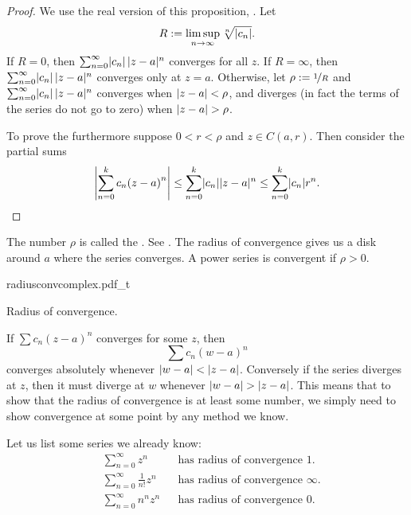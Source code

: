 \begin{proof}
We use the real version of this proposition,
.
Let
\begin{equation*}
R := \limsup_{n\to\infty} \sqrt[n]{\lvert {c_n} \rvert} .
\end{equation*}
If $R = 0$, then
$\sum_{n=0}^\infty \lvert {c_n} \rvert \, \lvert {z-a} \rvert^n$ converges for all $z$.
If $R = \infty$, then
$\sum_{n=0}^\infty \lvert {c_n} \rvert \, \lvert {z-a} \rvert^n$ converges only at $z=a$.
Otherwise, let $\rho := \nicefrac{1}{R}$ and
$\sum_{n=0}^\infty \lvert {c_n} \rvert \, \lvert {z-a} \rvert^n$ converges when
$\lvert {z-a} \rvert < \rho$, and diverges (in fact the terms of the series
do not go to zero) when $\lvert {z-a} \rvert > \rho$.

To prove the furthermore suppose
$0 < r < \rho$ and $z \in C(a,r)$.  Then
consider the partial sums
\begin{equation*}
\left\lvert {\sum_{n=0}^k c_n {(z-a)}^n} \right\rvert
\leq
\sum_{n=0}^k \lvert {c_n} \rvert \lvert {z-a} \rvert^n
\leq
\sum_{n=0}^k \lvert {c_n} \rvert r^n . \qedhere
\end{equation*}
\end{proof}

The number $\rho$ is called the \emph{}.
See .
The radius of convergence gives us a disk around $a$ where the series converges.  A power series
is convergent if $\rho > 0$.
\begin{myfigureht}
{radiusconvcomplex.pdf_t}
\caption{Radius of convergence.\label{fig:radiusconvcomplex}}
\end{myfigureht}

If $\sum c_n {(z-a)}^n$ converges for some $z$, then
\begin{equation*}
\sum c_n {(w-a)}^n
\end{equation*}
converges absolutely whenever $\lvert {w-a} \rvert < \lvert {z-a} \rvert$.
Conversely if the series diverges at $z$, then it must diverge at $w$
whenever $\lvert {w-a} \rvert > \lvert {z-a} \rvert$.
This means that to show
that the radius of convergence is at least some number, we simply need to
show convergence at some point by any method we know.

\begin{example}
Let us list some series we already know:
\begin{align*}
& &
& \sum_{n=0}^\infty z^n
& & \text{has radius of convergence } 1.
& &
\\
& &
& \sum_{n=0}^\infty \frac{1}{n!} z^n
& & \text{has radius of convergence } \infty.
& &
\\
& &
& \sum_{n=0}^\infty n^n z^n
& & \text{has radius of convergence } 0.
& &
\end{align*}
\end{example}

